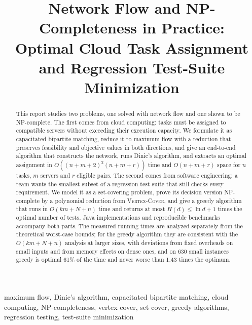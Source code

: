 \documentclass[conference]{IEEEtran}
\theoremstyle{definition}
\theoremstyle{remark}
\newcommand{\VC}{\textsc{Vertex-Cover}}
\begin{document}
\title{Network Flow and NP-Completeness in Practice:\\
Optimal Cloud Task Assignment and Regression Test-Suite Minimization}

\author{
\and
{}
}

\maketitle

\begin{abstract}
This report studies two problems, one solved with network flow and one shown
to be NP-complete. The first comes from cloud computing: tasks must be
assigned to compatible servers without exceeding their execution capacity.
We formulate it as capacitated bipartite matching, reduce it to maximum flow
with a reduction that preserves feasibility and objective values in both
directions, and give an end-to-end algorithm that constructs the network,
runs Dinic's algorithm, and extracts an optimal assignment in
$O((n+m+2)^2(n+m+r))$ time and $O(n+m+r)$ space for $n$ tasks, $m$ servers
and $r$ eligible pairs. The second comes from software engineering: a team
wants the smallest subset of a regression test suite that still checks every
requirement. We model it as a set-covering problem, prove its decision
version NP-complete by a polynomial reduction from \VC{}, and give a greedy
algorithm that runs in $O(km + N + n)$ time and returns at most
$H(d) \le \ln d + 1$ times the optimal number of tests. Java implementations
and reproducible benchmarks accompany both parts. The measured running times
are analyzed separately from the theoretical worst-case bounds; for the
greedy algorithm they are consistent with the $O(km + N + n)$ analysis at
larger sizes, with deviations from fixed overheads on small inputs and from
memory effects on dense ones, and on 630 small instances greedy is optimal
61\% of the time and never worse than 1.43 times the optimum.
\end{abstract}

\begin{IEEEkeywords}
maximum flow, Dinic's algorithm, capacitated bipartite matching, cloud
computing, NP-completeness, vertex cover, set cover, greedy algorithms,
regression testing, test-suite minimization
\end{IEEEkeywords}
\end{document}
